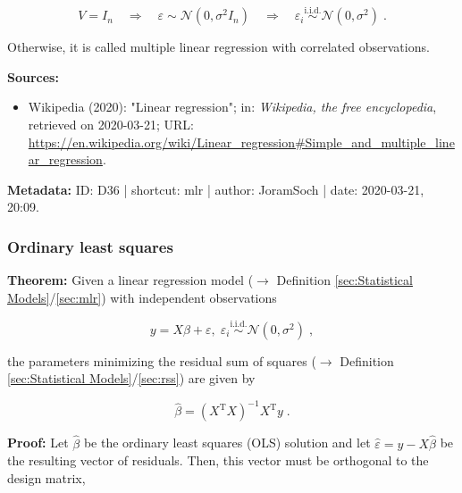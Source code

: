 \documentclass[a4paper,12pt,twoside]{book}
\begin{document}
\begin{equation} \label{eq:mlr-mlr-noise-iid}
V = I_n \quad \Rightarrow \quad \varepsilon \sim \mathcal{N}(0, \sigma^2 I_n) \quad \Rightarrow \quad \varepsilon_i \overset{\text{i.i.d.}}{\sim} \mathcal{N}(0, \sigma^2) \; .
\end{equation}

Otherwise, it is called multiple linear regression with correlated observations.


\vspace{1em}
\textbf{Sources:}
\begin{itemize}
\item Wikipedia (2020): "Linear regression"; in: \textit{Wikipedia, the free encyclopedia}, retrieved on 2020-03-21; URL: \url{https://en.wikipedia.org/wiki/Linear_regression#Simple_and_multiple_linear_regression}.
\end{itemize}


\vspace{1em}
\textbf{Metadata:} ID: D36 | shortcut: mlr | author: JoramSoch | date: 2020-03-21, 20:09.
\vspace{1em}



\subsubsection[\textbf{Ordinary least squares}]{Ordinary least squares} \label{sec:mlr-ols}
\setcounter{equation}{0}

\textbf{Theorem:} Given a linear regression model ($\rightarrow$ Definition \ref{sec:Statistical Models}/\ref{sec:mlr}) with independent observations

\begin{equation} \label{eq:mlr-ols-MLR}
y = X\beta + \varepsilon, \; \varepsilon_i \overset{\mathrm{i.i.d.}}{\sim} \mathcal{N}(0, \sigma^2) \; ,
\end{equation}

the parameters minimizing the residual sum of squares ($\rightarrow$ Definition \ref{sec:Statistical Models}/\ref{sec:rss}) are given by

\begin{equation} \label{eq:mlr-ols-OLS}
\hat{\beta} = (X^\mathrm{T} X)^{-1} X^\mathrm{T} y \; .
\end{equation}


\vspace{1em}
\textbf{Proof:} Let $\hat{\beta}$ be the ordinary least squares (OLS) solution and let $\hat{\varepsilon} = y - X\hat{\beta}$ be the resulting vector of residuals. Then, this vector must be orthogonal to the design matrix,
\end{document}
